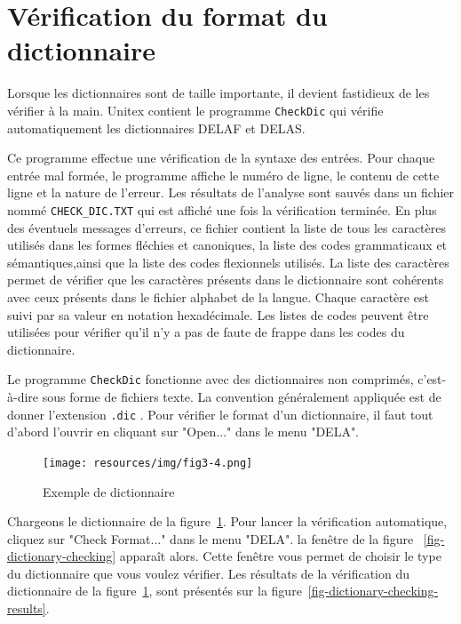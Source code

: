 \bigskip
\noindent





\section{Vérification du format du dictionnaire}
 
Lorsque les dictionnaires sont de taille importante, il devient fastidieux de les vérifier à
la main. Unitex contient le programme \verb+CheckDic+
 qui vérifie automatiquement les dictionnaires DELAF et DELAS.

\bigskip
\noindent Ce programme effectue une vérification de la syntaxe des entrées. Pour chaque entrée
mal formée, le programme affiche le numéro de ligne, le contenu de cette ligne et la nature
de l’erreur. Les résultats de l’analyse sont sauvés dans un fichier nommé
\verb+CHECK_DIC.TXT+ qui est affiché une fois la vérification
terminée. En plus des éventuels messages d’erreurs, ce fichier contient la liste de tous les
caractères utilisés dans les formes fléchies et canoniques, la liste des codes grammaticaux et
sémantiques,ainsi que la liste des codes flexionnels utilisés.
La liste des caractères permet de vérifier que les caractères présents dans le dictionnaire
sont cohérents avec ceux présents dans le fichier alphabet de la langue. Chaque caractère est
suivi par sa valeur en notation hexadécimale. Les listes de codes peuvent être utilisées pour
vérifier qu’il n’y a pas de faute de frappe dans les codes du dictionnaire.


\bigskip
\noindent Le programme \verb+CheckDic+ fonctionne avec des dictionnaires non comprimés, c’est-à-dire
sous forme de fichiers texte. La convention généralement appliquée est de donner l’extension
\verb+.dic+ . Pour vérifier le format d’un dictionnaire, il faut tout
d’abord l’ouvrir en cliquant sur "Open..." dans le menu "DELA".


\begin{figure}[!ht]
\begin{center}
\texttt{[image: resources/img/fig3-4.png]}
\caption{Exemple de dictionnaire\label{fig-dictionary-example}}
\end{center}
\end{figure}

\noindent Chargeons le dictionnaire de la figure~\ref{fig-dictionary-example}.
Pour lancer la vérification automatique, cliquez sur "Check Format..." dans le menu "DELA".
la fenêtre de la figure ~\ref{fig-dictionary-checking} apparaît alors.
Cette fenêtre vous permet de choisir le type du dictionnaire que vous voulez vérifier. Les
résultats de la vérification du dictionnaire de la figure~\ref{fig-dictionary-example},
 sont présentés sur la figure~\ref{fig-dictionary-checking-results}.

